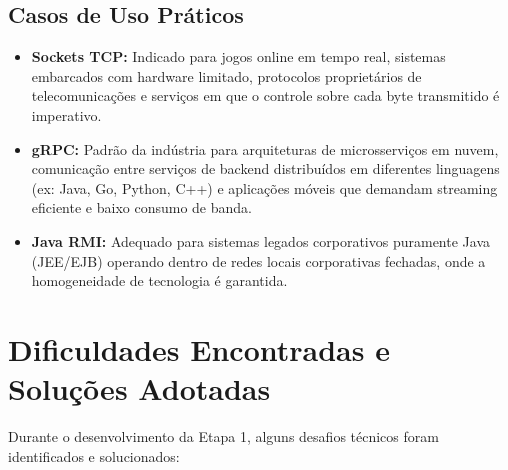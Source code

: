\documentclass[12pt,a4paper]{article}
\begin{document}
\subsection{Casos de Uso Práticos}
\begin{itemize}
    \item \textbf{Sockets TCP:} Indicado para jogos online em tempo real, sistemas embarcados com hardware limitado, protocolos proprietários de telecomunicações e serviços em que o controle sobre cada byte transmitido é imperativo.
    \item \textbf{gRPC:} Padrão da indústria para arquiteturas de microsserviços em nuvem, comunicação entre serviços de backend distribuídos em diferentes linguagens (ex: Java, Go, Python, C++) e aplicações móveis que demandam streaming eficiente e baixo consumo de banda.
    \item \textbf{Java RMI:} Adequado para sistemas legados corporativos puramente Java (JEE/EJB) operando dentro de redes locais corporativas fechadas, onde a homogeneidade de tecnologia é garantida.
\end{itemize}

\section{Dificuldades Encontradas e Soluções Adotadas}

Durante o desenvolvimento da Etapa 1, alguns desafios técnicos foram identificados e solucionados:
\end{document}
